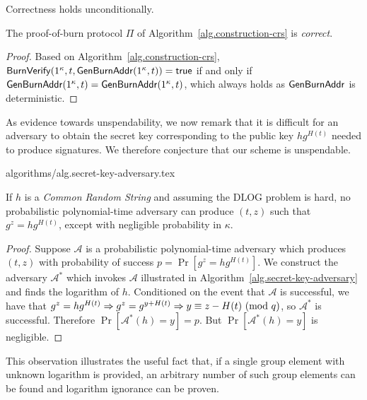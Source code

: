 Correctness holds unconditionally.

\begin{theorem}[Correctness]
  The proof-of-burn protocol $\Pi$ of Algorithm~\ref{alg.construction-crs} is \emph{correct}.
\end{theorem}
\begin{proof}
  Based on Algorithm~\ref{alg.construction-crs}, $\mathsf{BurnVerify}(1^\kappa, t, \mathsf{Gen}\-\mathsf{Burn}\-\mathsf{Addr}(1^\kappa, t)) = \textsf{true}$ if and only if $\mathsf{Gen}\-\mathsf{Burn}\-\mathsf{Addr}(1^\kappa, t) = \mathsf{Gen}\-\mathsf{Burn}\-\mathsf{Addr}(1^\kappa, t)$, which always holds as $\mathsf{Gen}\-\mathsf{Burn}\-\mathsf{Addr}$ is deterministic.
\end{proof}

As evidence towards unspendability, we now remark that it is difficult for an adversary to obtain the secret key corresponding to the public key $h g^{H(t)}$ needed to produce signatures. We therefore conjecture that our scheme is unspendable.

{algorithms/alg.secret-key-adversary.tex}

\begin{lem}
  If $h$ is a \emph{Common Random String} and assuming the DLOG problem is hard, no probabilistic polynomial-time adversary can produce $(t, z)$ such that $g^z = h g^{H(t)}$, except with negligible probability in $\kappa$.
\end{lem}
\begin{proof}
  Suppose $\mathcal{A}$ is a probabilistic polynomial-time adversary which produces $(t, z)$ with probability of success $p = \Pr[g^z = h g^{H(t)}]$.
  We construct the adversary $\mathcal{A}^*$ which invokes $\mathcal{A}$
  illustrated in Algorithm~\ref{alg.secret-key-adversary} and finds the
  logarithm of $h$.
  Conditioned on the event that $\mathcal{A}$ is successful,
  we have that
  $g^z = h g^{H(t)} \Rightarrow g^z = g^{y + H(t)} \Rightarrow y \equiv z - H(t) \ (\mathrm{mod}\ q)$, so $\mathcal{A}^*$ is successful.
  Therefore $\Pr[\mathcal{A}^*(h) = y] = p$.
  But $\Pr[\mathcal{A}^*(h) = y]$ is negligible.
\end{proof}

This observation illustrates the useful fact that, if a single group element with unknown logarithm is provided, an arbitrary number of such group elements can be found and logarithm ignorance can be proven.

